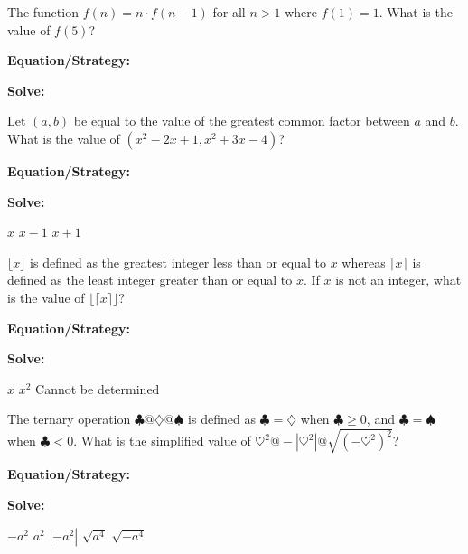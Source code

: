 \vfill
\newpage
\begin{multicols*}{2}
\begin{outline}[enumerate]
\medium

\1 The function $f(n)=n\cdot f(n-1)$ for all $n>1$ where $f(1)=1$. What is the value of $f(5)$?

\bigskip
\textbf{Equation/Strategy:} \hrulefill

\bigskip
\textbf{Solve:}

\vfill
{}

\midline

\1 Let $(a,b)$ be equal to the value of the greatest common factor between $a$ and $b$. What is the value of $(x^2-2x+1, x^2+3x-4)$?

\bigskip
\textbf{Equation/Strategy:} \hrulefill

\bigskip
\textbf{Solve:}

\vfill
{}
\2 $x$
\2 $x-1$
\2 $x+1$

\columnbreak
\advanced

\1 $\lfloor x\rfloor$ is defined as the greatest integer less than or equal to $x$ whereas $\lceil x\rceil$ is defined as the least integer greater than or equal to $x$. If $x$ is not an integer, what is the value of $\lfloor\lceil x\rceil\rfloor$?

\bigskip
\textbf{Equation/Strategy:} \hrulefill

\bigskip
\textbf{Solve:}

\vfill
{}
\2 $x$
\2 $x^2$
\2 Cannot be determined

\midline

\1 The ternary operation $\clubsuit@\diamondsuit@\spadesuit$ is defined as $\clubsuit=\diamondsuit$ when $\clubsuit\geq0$, and $\clubsuit=\spadesuit$ when $\clubsuit<0$. What is the simplified value of $\heartsuit^2@-\left|\heartsuit^2\right|@\sqrt{(-\heartsuit^2)^2}$?

\bigskip
\textbf{Equation/Strategy:} \hrulefill

\bigskip
\textbf{Solve:}

\vfill
\2 $-a^2$
\2 $a^2$
\2 $\left|-a^2\right|$
\2 $\sqrt{a^4}$
\2 $\sqrt{-a^4}$
\end{outline}
\end{multicols*}